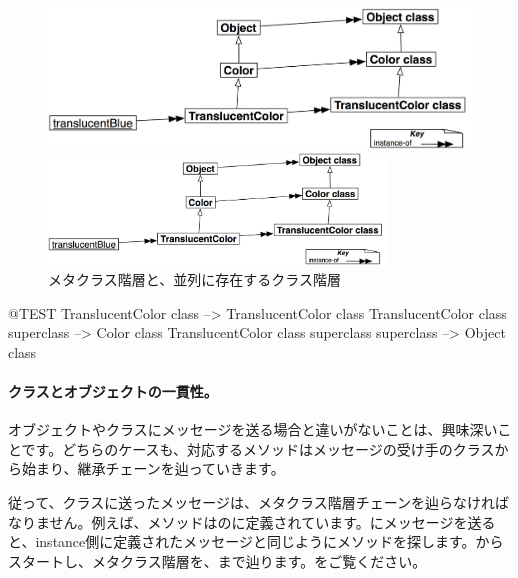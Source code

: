 \documentclass[a4paper,10pt,twoside]{book}
\begin{document}
\begin{center}
\begin{figure}[!ht]
\ifluluelse
	{\centerline {\includegraphics[width=\textwidth]{TranslucentMetaclassHierarchy}}}
	{\centerline {\includegraphics[width=0.8\textwidth]{TranslucentMetaclassHierarchy}}}
\caption{メタクラス階層と、並列に存在するクラス階層}
\end{figure}
\end{center}

\begin{code}{@TEST}
TranslucentColor class                                     --> TranslucentColor class
TranslucentColor class superclass                   --> Color class
TranslucentColor class superclass superclass --> Object class
\end{code}

\paragraph{クラスとオブジェクトの一貫性。}オブジェクトやクラスにメッセージを送る場合と違いがないことは、興味深いことです。どちらのケースも、対応するメソッドはメッセージの受け手のクラスから始まり、継承チェーンを辿っていきます。

従って、クラスに送ったメッセージは、メタクラス階層チェーンを辿らなければなりません。例えば、メソッドはのに定義されています。にメッセージを送ると、instance側に定義されたメッセージと同じようにメソッドを探します。からスタートし、メタクラス階層を、まで辿ります。をご覧ください。
\end{document}
